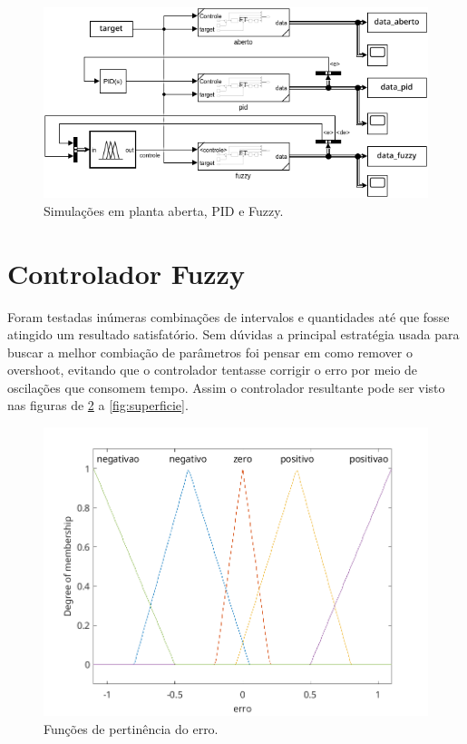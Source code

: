 \documentclass[12pt]{article}
\begin{document}
\begin{figure}
  \centering
  \includegraphics{fig/modelo.png}
  \caption{Simulações em planta aberta, PID e Fuzzy.}
  \label{fig:modelo}
\end{figure}

\section{Controlador Fuzzy}

Foram testadas inúmeras combinações de intervalos e quantidades até que fosse atingido um resultado satisfatório. Sem dúvidas a principal estratégia usada para buscar a melhor combiação de parâmetros foi pensar em como remover o overshoot, evitando que o controlador tentasse corrigir o erro por meio de oscilações que consomem tempo. Assim o controlador resultante pode ser visto nas figuras de \ref{fig:input_1} a \ref{fig:superficie}.

\begin{figure}
  \centering
  \includegraphics{fig/fuzzy_input_1.png}
  \caption{Funções de pertinência do erro.}
  \label{fig:input_1}
\end{figure}
\end{document}
